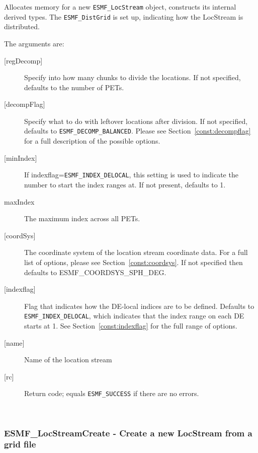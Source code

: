       Allocates memory for a new {\tt ESMF\_LocStream} object, constructs its
       internal derived types.  The {\tt ESMF\_DistGrid} is set up, indicating
       how the LocStream is distributed. 
  
       The arguments are:
       \begin{description}
       \item[{[regDecomp]}]
            Specify into how many chunks to divide the locations. 
            If not specified, defaults to the number of PETs.
       \item[{[decompFlag]}]
            \begin{sloppypar}
            Specify what to do with leftover locations after division.
            If not specified, defaults to {\tt ESMF\_DECOMP\_BALANCED}. Please
            see Section~\ref{const:decompflag} for a full description of the 
            possible options. 
            \end{sloppypar}
       \item[{[minIndex]}] 
            If indexflag={\tt ESMF\_INDEX\_DELOCAL}, this setting is used to indicate
            the number to start the index ranges at. If not present, defaults to 1.
       \item[maxIndex]
            The maximum index across all PETs.
       \item[{[coordSys]}]
           The coordinate system of the location stream coordinate data.
           For a full list of options, please see Section~\ref{const:coordsys}.
           If not specified then defaults to ESMF\_COORDSYS\_SPH\_DEG.
       \item[{[indexflag]}]
            Flag that indicates how the DE-local indices are to be defined.
            Defaults to {\tt ESMF\_INDEX\_DELOCAL}, which indicates
            that the index range on each DE starts at 1. See Section~\ref{const:indexflag}
            for the full range of options. 
       \item[{[name]}]
            Name of the location stream
       \item[{[rc]}]
            Return code; equals {\tt ESMF\_SUCCESS} if there are no errors.
     \end{description}
   
 
\mbox{}\hrulefill\ 
 
\subsubsection [ESMF\_LocStreamCreate] {ESMF\_LocStreamCreate - Create a new LocStream from a grid file}


